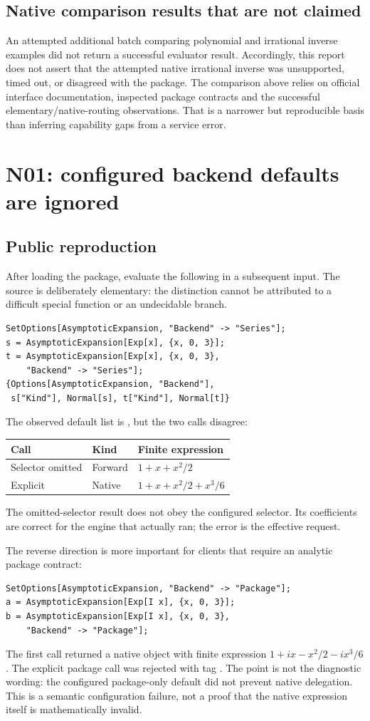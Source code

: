 \documentclass[11pt,a4paper]{article}
\newcommand{\code}[1]{\texttt{\detokenize{#1}}}
\begin{document}
\subsection{Native comparison results that are not claimed}
An attempted additional batch comparing polynomial and irrational inverse examples did not return a successful evaluator result. Accordingly, this report does not assert that the attempted native irrational inverse was unsupported, timed out, or disagreed with the package. The comparison above relies on official interface documentation, inspected package contracts and the successful elementary/native-routing observations. That is a narrower but reproducible basis than inferring capability gaps from a service error.

\section{N01: configured backend defaults are ignored}
\label{sec:n01}
\subsection{Public reproduction}
After loading the package, evaluate the following in a subsequent input. The source is deliberately elementary: the distinction cannot be attributed to a difficult special function or an undecidable branch.
\begin{lstlisting}
SetOptions[AsymptoticExpansion, "Backend" -> "Series"];
s = AsymptoticExpansion[Exp[x], {x, 0, 3}];
t = AsymptoticExpansion[Exp[x], {x, 0, 3},
    "Backend" -> "Series"];
{Options[AsymptoticExpansion, "Backend"],
 s["Kind"], Normal[s], t["Kind"], Normal[t]}
\end{lstlisting}
The observed default list is \code{{"Backend" -> "Series"}}, but the two calls disagree:
\begin{center}
\begin{tabular}{lll}\toprule
Call & Kind & Finite expression\\\midrule
Selector omitted & Forward & $1+x+x^2/2$\\
Explicit \code{"Series"} & Native & $1+x+x^2/2+x^3/6$\\\bottomrule
\end{tabular}
\end{center}
The omitted-selector result does not obey the configured selector. Its coefficients are correct for the engine that actually ran; the error is the effective request.

The reverse direction is more important for clients that require an analytic package contract:
\begin{lstlisting}
SetOptions[AsymptoticExpansion, "Backend" -> "Package"];
a = AsymptoticExpansion[Exp[I x], {x, 0, 3}];
b = AsymptoticExpansion[Exp[I x], {x, 0, 3},
    "Backend" -> "Package"];
\end{lstlisting}
The first call returned a native object with finite expression
$1+ix-x^2/2-ix^3/6$. The explicit package call was rejected with tag \code{InexactInput}. The point is not the diagnostic wording: the configured package-only default did not prevent native delegation. This is a semantic configuration failure, not a proof that the native expression itself is mathematically invalid.
\end{document}
